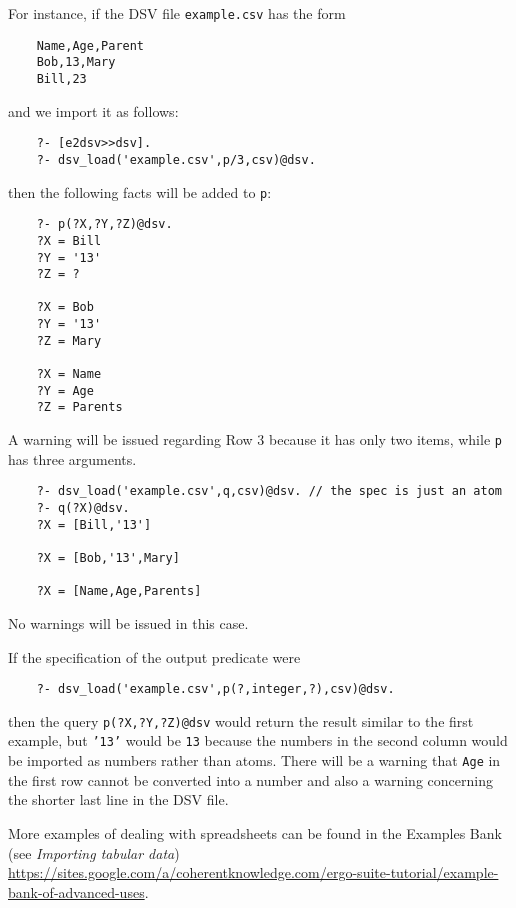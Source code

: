 For instance, if the DSV file \texttt{example.csv} has the form
\begin{verbatim}
    Name,Age,Parent 
    Bob,13,Mary
    Bill,23
\end{verbatim}
and we import it as follows:
\begin{verbatim}
    ?- [e2dsv>>dsv].
    ?- dsv_load('example.csv',p/3,csv)@dsv.
\end{verbatim}
then the following facts will be added to \texttt{p}:
\begin{verbatim}
    ?- p(?X,?Y,?Z)@dsv.
    ?X = Bill
    ?Y = '13'
    ?Z = ?

    ?X = Bob
    ?Y = '13'
    ?Z = Mary

    ?X = Name
    ?Y = Age
    ?Z = Parents
\end{verbatim}
A warning will be issued regarding Row 3 because it has only two items,
while \texttt{p} has three arguments. 
\begin{verbatim}
    ?- dsv_load('example.csv',q,csv)@dsv. // the spec is just an atom
    ?- q(?X)@dsv.
    ?X = [Bill,'13']

    ?X = [Bob,'13',Mary]

    ?X = [Name,Age,Parents]
\end{verbatim}
No warnings will be issued in this case.

If the specification of the output predicate were 
\begin{verbatim}
    ?- dsv_load('example.csv',p(?,integer,?),csv)@dsv.
\end{verbatim}
then the query \texttt{p(?X,?Y,?Z)@dsv} would return the result similar to
the first example, but \texttt{'13'} would be \texttt{13} because the
numbers in the second column would be imported as numbers rather than atoms.
There will be a warning that \texttt{Age} in the first row cannot  
be converted into a number and also a warning concerning the shorter last
line in the DSV file.

More examples of dealing with spreadsheets can be found in the \ERGO
Examples Bank (see \emph{Importing tabular data})
\url{https://sites.google.com/a/coherentknowledge.com/ergo-suite-tutorial/example-bank-of-advanced-uses}.

